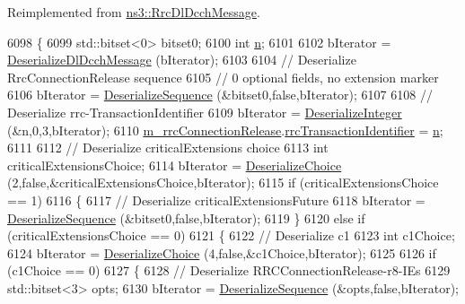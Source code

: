 Reimplemented from \hyperlink{classns3_1_1RrcDlDcchMessage_a656baac96990031053ce3fb4f1ec596a}{ns3\+::\+Rrc\+Dl\+Dcch\+Message}.


\begin{DoxyCode}
6098 \{
6099   std::bitset<0> bitset0;
6100   \textcolor{keywordtype}{int} \hyperlink{namespacesample-rng-plot_aeb5ee5c431e338ef39b7ac5431242e1d}{n};
6101 
6102   bIterator = \hyperlink{classns3_1_1RrcDlDcchMessage_afa8618901d8be7727b6a579a246055b2}{DeserializeDlDcchMessage} (bIterator);
6103 
6104   \textcolor{comment}{// Deserialize RrcConnectionRelease sequence}
6105   \textcolor{comment}{// 0 optional fields, no extension marker}
6106   bIterator = \hyperlink{classns3_1_1Asn1Header_a58c68bb97ba3fe2e8fcdd7c208d672b2}{DeserializeSequence} (&bitset0,\textcolor{keyword}{false},bIterator);
6107 
6108   \textcolor{comment}{// Deserialize rrc-TransactionIdentifier}
6109   bIterator = \hyperlink{classns3_1_1Asn1Header_a49802c9af30018b078150e866b6ecae2}{DeserializeInteger} (&n,0,3,bIterator);
6110   \hyperlink{classns3_1_1RrcConnectionReleaseHeader_af5b75bfe8c9734280de8393550954dad}{m\_rrcConnectionRelease}.\hyperlink{structns3_1_1LteRrcSap_1_1RrcConnectionRelease_ae42253cc116e82e0bd157fabd6ecfeb3}{rrcTransactionIdentifier} = 
      \hyperlink{namespacesample-rng-plot_aeb5ee5c431e338ef39b7ac5431242e1d}{n};
6111 
6112   \textcolor{comment}{// Deserialize criticalExtensions choice}
6113   \textcolor{keywordtype}{int} criticalExtensionsChoice;
6114   bIterator = \hyperlink{classns3_1_1Asn1Header_a0af5881f07a0549a8693a1b75c229a90}{DeserializeChoice} (2,\textcolor{keyword}{false},&criticalExtensionsChoice,bIterator);
6115   \textcolor{keywordflow}{if} (criticalExtensionsChoice == 1)
6116     \{
6117       \textcolor{comment}{// Deserialize criticalExtensionsFuture}
6118       bIterator = \hyperlink{classns3_1_1Asn1Header_a58c68bb97ba3fe2e8fcdd7c208d672b2}{DeserializeSequence} (&bitset0,\textcolor{keyword}{false},bIterator);
6119     \}
6120   \textcolor{keywordflow}{else} \textcolor{keywordflow}{if} (criticalExtensionsChoice == 0)
6121     \{
6122       \textcolor{comment}{// Deserialize c1}
6123       \textcolor{keywordtype}{int} c1Choice;
6124       bIterator = \hyperlink{classns3_1_1Asn1Header_a0af5881f07a0549a8693a1b75c229a90}{DeserializeChoice} (4,\textcolor{keyword}{false},&c1Choice,bIterator);
6125 
6126       \textcolor{keywordflow}{if} (c1Choice == 0)
6127         \{
6128           \textcolor{comment}{// Deserialize RRCConnectionRelease-r8-IEs}
6129           std::bitset<3> opts;
6130           bIterator = \hyperlink{classns3_1_1Asn1Header_a58c68bb97ba3fe2e8fcdd7c208d672b2}{DeserializeSequence} (&opts,\textcolor{keyword}{false},bIterator);

\end{DoxyCode}
